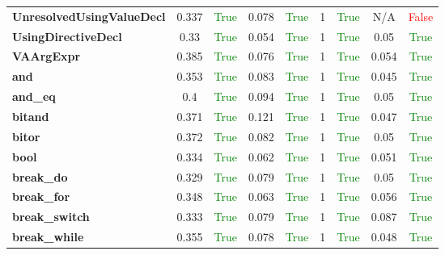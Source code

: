 \documentclass{article}
\begin{document}
\begin{xltabular}{\textwidth}{lcccccccc}
\textbf{{\fontsize{10}{12}\selectfont UnresolvedUsingValueDecl}}& 0.337&\textcolor{green}{True}& 0.078&\textcolor{green}{True}& 1&\textcolor{green}{True}& N/A&\textcolor{red}{False} \\[0.5ex]
\textbf{{\fontsize{10}{12}\selectfont UsingDirectiveDecl}}& 0.33&\textcolor{green}{True}& 0.054&\textcolor{green}{True}& 1&\textcolor{green}{True}& 0.05&\textcolor{green}{True} \\[0.5ex]
\textbf{{\fontsize{10}{12}\selectfont VAArgExpr}}& 0.385&\textcolor{green}{True}& 0.076&\textcolor{green}{True}& 1&\textcolor{green}{True}& 0.054&\textcolor{green}{True} \\[0.5ex]
\textbf{{\fontsize{10}{12}\selectfont and}}& 0.353&\textcolor{green}{True}& 0.083&\textcolor{green}{True}& 1&\textcolor{green}{True}& 0.045&\textcolor{green}{True} \\[0.5ex]
\textbf{{\fontsize{10}{12}\selectfont and\_eq}}& 0.4&\textcolor{green}{True}& 0.094&\textcolor{green}{True}& 1&\textcolor{green}{True}& 0.05&\textcolor{green}{True} \\[0.5ex]
\textbf{{\fontsize{10}{12}\selectfont bitand}}& 0.371&\textcolor{green}{True}& 0.121&\textcolor{green}{True}& 1&\textcolor{green}{True}& 0.047&\textcolor{green}{True} \\[0.5ex]
\textbf{{\fontsize{10}{12}\selectfont bitor}}& 0.372&\textcolor{green}{True}& 0.082&\textcolor{green}{True}& 1&\textcolor{green}{True}& 0.05&\textcolor{green}{True} \\[0.5ex]
\textbf{{\fontsize{10}{12}\selectfont bool}}& 0.334&\textcolor{green}{True}& 0.062&\textcolor{green}{True}& 1&\textcolor{green}{True}& 0.051&\textcolor{green}{True} \\[0.5ex]
\textbf{{\fontsize{10}{12}\selectfont break\_do}}& 0.329&\textcolor{green}{True}& 0.079&\textcolor{green}{True}& 1&\textcolor{green}{True}& 0.05&\textcolor{green}{True} \\[0.5ex]
\textbf{{\fontsize{10}{12}\selectfont break\_for}}& 0.348&\textcolor{green}{True}& 0.063&\textcolor{green}{True}& 1&\textcolor{green}{True}& 0.056&\textcolor{green}{True} \\[0.5ex]
\textbf{{\fontsize{10}{12}\selectfont break\_switch}}& 0.333&\textcolor{green}{True}& 0.079&\textcolor{green}{True}& 1&\textcolor{green}{True}& 0.087&\textcolor{green}{True} \\[0.5ex]
\textbf{{\fontsize{10}{12}\selectfont break\_while}}& 0.355&\textcolor{green}{True}& 0.078&\textcolor{green}{True}& 1&\textcolor{green}{True}& 0.048&\textcolor{green}{True} \\[0.5ex]

\end{xltabular}
\end{document}
